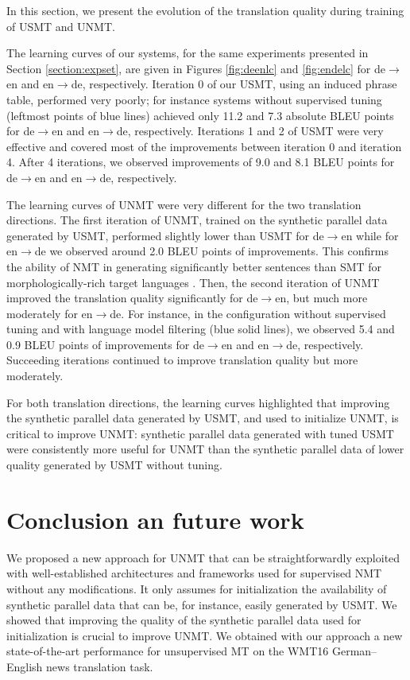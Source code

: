 \documentclass[11pt,a4paper]{article}
\begin{document}
In this section, we present the evolution of the translation quality during training of USMT and UNMT.

The learning curves of our systems, for the same experiments presented in Section \ref{section:expset}, are given in Figures \ref{fig:deenlc} and \ref{fig:endelc} for de$\rightarrow$en and en$\rightarrow$de, respectively.
Iteration 0 of our USMT, using an induced phrase table, performed very poorly; for instance systems without supervised tuning (leftmost points of blue lines) achieved only 11.2 and 7.3 absolute BLEU points for de$\rightarrow$en and en$\rightarrow$de, respectively.  Iterations 1 and 2 of USMT were very effective and covered most of the improvements between iteration 0 and iteration 4. After 4 iterations, we observed improvements of 9.0 and 8.1 BLEU points for de$\rightarrow$en and en$\rightarrow$de, respectively.

The learning curves of UNMT were very different for the two translation directions.
The first iteration of UNMT, trained on the synthetic parallel data generated by USMT, performed slightly lower than USMT for de$\rightarrow$en while for en$\rightarrow$de we observed around 2.0 BLEU points of improvements. This confirms the ability of NMT in generating significantly better sentences than SMT for morphologically-rich target languages \citep{bentivogli-EtAl:2016:EMNLP2016}. Then, the second iteration of UNMT improved the translation quality significantly for de$\rightarrow$en, but much more moderately for en$\rightarrow$de. For instance, in the configuration without supervised tuning and with language model filtering (blue solid lines), we observed 5.4 and 0.9 BLEU points of improvements for de$\rightarrow$en and en$\rightarrow$de, respectively. Succeeding iterations continued to improve translation quality but more moderately.

For both translation directions, the learning curves highlighted that improving the synthetic parallel data generated by USMT, and used to initialize UNMT, is critical to improve UNMT: synthetic parallel data generated with tuned USMT were consistently more useful for UNMT than the synthetic parallel data of lower quality generated by USMT without tuning.



\section{Conclusion an future work}
We proposed a new approach for UNMT that can be straightforwardly exploited with well-established architectures and frameworks used for supervised NMT without any modifications. It only assumes for initialization the availability of synthetic parallel data that can be, for instance, easily generated by USMT. We showed that improving the quality of the synthetic parallel data used for initialization is crucial to improve UNMT. We obtained with our approach a new state-of-the-art performance for unsupervised MT on the WMT16 German--English news translation task.
\end{document}
